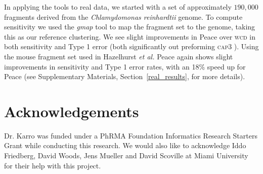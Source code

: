 \documentclass[a4,center,fleqn]{NAR}
\newcommand{\wcd}{\textsc{wcd }}
\newcommand{\capthree}{\textsc{cap3 }}
\begin{document}
In applying the tools to real data, we started with a set of
approximately $190,000$ fragments derived from the {\it Chlamydomonas
  reinhardtii} genome.  To compute sensitivity we used the {\it gmap}
tool \cite{Wu05} to map the fragment set to the genome, taking this as
our reference clustering.  We see slight improvements in
{\sc Peace} over \wcd in both sensitivity and Type 1 error
(both significantly out preforming \capthree).  Using the mouse fragment
set used in Hazelhurst {\it et al.}  \cite{Hazelhurst08a}
{\sc Peace} again shows slight improvements in sensitivity and Type
1 error rates, with an 18\% speed up for {\sc Peace} (see
Supplementary Materials, Section~\ref{real_results}, for more
details).

\section{Acknowledgements}

Dr. Karro was funded under a PhRMA Foundation Informatics Research
Starters Grant while conducting this research.  We would also like to
acknowledge Iddo Friedberg, David Woods, Jens Mueller and David
Scoville at Miami University for their help with this project.

\vspace{3mm}


\end{document}

